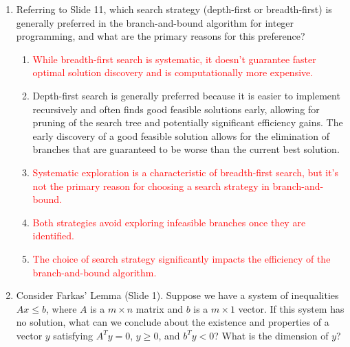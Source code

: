 \documentclass{article}%
\newcommand{\incorrect}[1]{\textcolor{red}{#1}}
\begin{document}
\begin{enumerate}
\begin{enumerate}
\item \incorrect{The optimality of the solution is a consequence of the validity of the cuts; invalid cuts can lead to any outcome.}%
\item The Gomory cut method relies on the fractional parts of the coefficients and variables in the optimal simplex tableau of the linear programming relaxation. If the coefficients are not integers, the fractional parts are not well-defined, and the cuts generated might not be valid, leading to an incorrect or infeasible solution.%
\end{enumerate}%
\vspace{1em}%
\item Referring to Slide 11, which search strategy (depth-first or breadth-first) is generally preferred in the branch-and-bound algorithm for integer programming, and what are the primary reasons for this preference?%
\begin{enumerate}%
\item \incorrect{While breadth-first search is systematic, it doesn't guarantee faster optimal solution discovery and is computationally more expensive.}%
\item Depth-first search is generally preferred because it is easier to implement recursively and often finds good feasible solutions early, allowing for pruning of the search tree and potentially significant efficiency gains.  The early discovery of a good feasible solution allows for the elimination of branches that are guaranteed to be worse than the current best solution.%
\item \incorrect{Systematic exploration is a characteristic of breadth-first search, but it's not the primary reason for choosing a search strategy in branch-and-bound.}%
\item \incorrect{Both strategies avoid exploring infeasible branches once they are identified.}%
\item \incorrect{The choice of search strategy significantly impacts the efficiency of the branch-and-bound algorithm.}%
\end{enumerate}%
\vspace{1em}%
\item Consider Farkas' Lemma (Slide 1).  Suppose we have a system of inequalities $Ax \le b$, where $A$ is a $m \times n$ matrix and $b$ is a $m \times 1$ vector.  If this system has no solution, what can we conclude about the existence and properties of a vector $y$ satisfying $A^T y = 0$, $y \ge 0$, and $b^T y < 0$?  What is the dimension of $y$?%

\end{enumerate}
\end{document}
